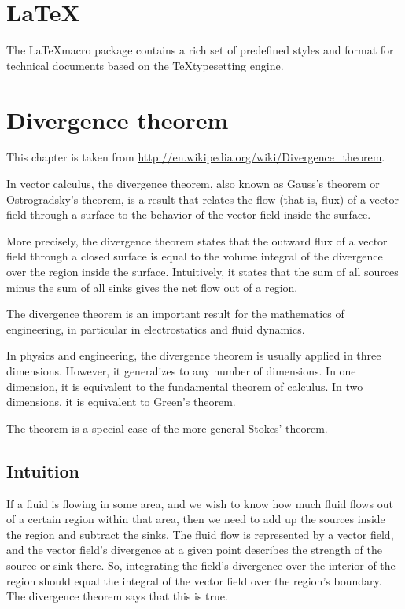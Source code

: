 \chapter{\LaTeX}


The \LaTeX macro package contains a rich set of
predefined styles and format for technical documents based on
the \TeX typesetting engine\cite{oetiker1995not}. 

\chapter{Divergence theorem}

This chapter is taken from \url{http://en.wikipedia.org/wiki/Divergence_theorem}.

In vector calculus, the divergence theorem, also known as Gauss's theorem or
Ostrogradsky's theorem\cite{katz1979history}, is a result that relates the flow (that is, flux)
of a vector field through a surface to the behavior of the vector field inside the surface.

More precisely, the divergence theorem states that the outward flux of a vector
field through a closed surface is equal to the volume integral of the divergence
over the region inside the surface. Intuitively, it states that the sum of all
sources minus the sum of all sinks gives the net flow out of a region.

The divergence theorem is an important result for the mathematics of engineering,
in particular in electrostatics and fluid dynamics.

In physics and engineering, the divergence theorem is usually applied in three dimensions.
However, it generalizes to any number of dimensions. 
In one dimension, it is equivalent to the fundamental theorem of calculus.
In two dimensions, it is equivalent to Green's theorem.

The theorem is a special case of the more general Stokes' theorem.


\section{Intuition} 
If a fluid is flowing in some area, and we wish to know how much fluid flows
out of a certain region within that area, then we need to add up the sources 
inside the region and subtract the sinks. The fluid flow is represented by a
vector field, and the vector field's divergence at a given point describes 
the strength of the source or sink there. So, integrating the field's divergence
 over the interior of the region should equal the integral of the vector field 
over the region's boundary. The divergence theorem says that this is true.

